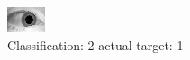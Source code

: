 \begin{figure}[h!]
\begin{center}
\includegraphics[width=0.60\columnwidth]{figures/ID1490_class_2_target_1.png}
\end{center}
\caption{ Classification: 2 actual target: 1}
\label{fig:ID1490_class_2_target_1}
\end{figure}
